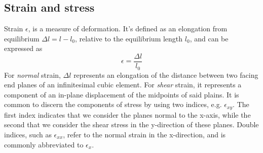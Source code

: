 \documentclass[twoside,english]{uiofysmaster}
\begin{document}
\subsection{Strain and stress}
Strain $\epsilon$, is a measure of deformation. 
It's defined as an elongation from equilibrium $\Delta l = l-l_0$, relative to the equilibrium length  $l_0$, and can be expressed as
\begin{equation}
\epsilon = \frac{\Delta l}{l_0}
\end{equation}
For \textit{normal} strain, $\Delta l$ represents an elongation of the distance between two facing end planes of an infinitesimal cubic element.
For \textit{shear} strain, it represents a component of an in-plane displacement of the midpoints of said plains.
It is common \cite{theoryOfElasticity,introductionToElasticity} to discern the components of stress by using two indices, e.g. $\epsilon_{xy}$.
The first index indicates that we consider the planes normal to the x-axis, while the second that we consider the shear stress in the y-direction of these planes. 
Double indices, such as $\epsilon_{xx}$, refer to the normal strain in the x-direction, and is commonly abbreviated to   $\epsilon_{x}$.
\end{document}
